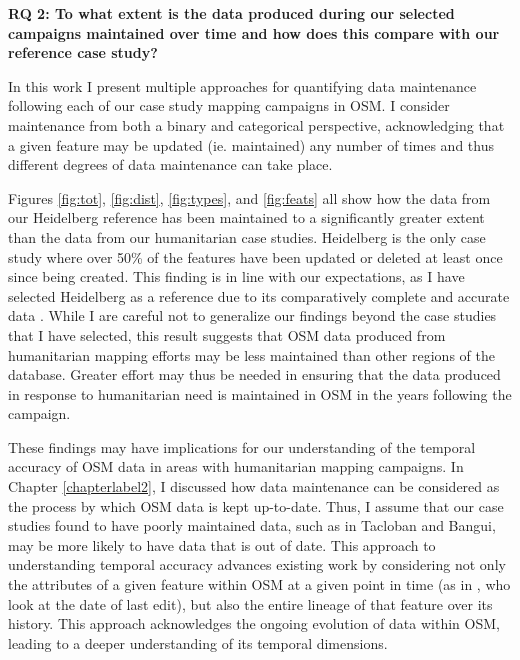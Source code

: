 \noindent\textbf{RQ 2: To what extent is the data produced during our selected campaigns maintained over time and how does this compare with our reference case study?}

In this work I present multiple approaches for quantifying data maintenance following each of our case study mapping campaigns in OSM. I consider maintenance from both a binary and categorical perspective, acknowledging that a given feature may be updated (ie. maintained) any number of times and thus different degrees of data maintenance can take place. 

Figures \ref{fig:tot}, \ref{fig:dist}, \ref{fig:types}, and \ref{fig:feats} all show how the data from our Heidelberg reference has been maintained to a significantly greater extent than the data from our humanitarian case studies. Heidelberg is the only case study where over 50\% of the features have been updated or deleted at least once since being created. This finding is in line with our expectations, as I have selected Heidelberg as a reference due to its comparatively complete and accurate data \parencite{arsanjani_assessing_2013}. While I are careful not to generalize our findings beyond the case studies that I have selected, this result suggests that OSM data produced from humanitarian mapping efforts may be less maintained than other regions of the database. Greater effort may thus be needed in ensuring that the data produced in response to humanitarian need is maintained in OSM in the years following the campaign. 

These findings may have implications for our understanding of the temporal accuracy of OSM data in areas with humanitarian mapping campaigns. In Chapter \ref{chapterlabel2}, I discussed how data maintenance can be considered as the process by which OSM data is kept up-to-date. Thus, I assume that our case studies found to have poorly maintained data, such as in Tacloban and Bangui, may be more likely to have data that is out of date. This approach to understanding temporal accuracy advances existing work by considering not only the attributes of a given feature within OSM at a given point in time (as in \textcite{barron_comprehensive_2014}, who look at the date of last edit), but also the entire lineage of that feature over its history. This approach acknowledges the ongoing evolution of data within OSM, leading to a deeper understanding of its temporal dimensions. 

